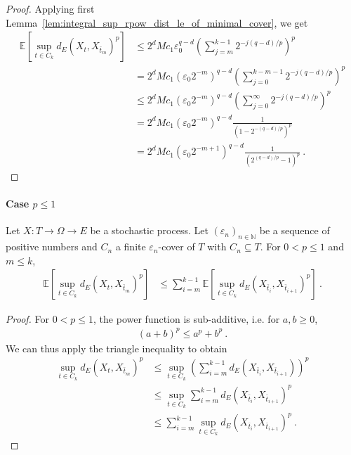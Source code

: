 \begin{proof}
Applying first Lemma~\ref{lem:integral_sup_rpow_dist_le_of_minimal_cover}, we get
\begin{align*}
  \mathbb{E} \left[\sup_{t \in C_k} d_E(X_t, X_{\bar{t}_m})^p \right]
  &\le 2^d M c_1 \varepsilon_0^{q - d} \left( \sum_{j=m}^{k-1} 2^{- j(q - d)/p} \right)^p
  \\
  &= 2^d M c_1 (\varepsilon_0 2^{-m})^{q - d} \left( \sum_{j=0}^{k-m-1} 2^{- j(q - d)/p} \right)^p
  \\
  &\le 2^d M c_1 (\varepsilon_0 2^{-m})^{q - d} \left( \sum_{j=0}^{\infty} 2^{- j(q - d)/p} \right)^p
  \\
  &= 2^d M c_1 (\varepsilon_0 2^{-m})^{q - d} \frac{1}{(1 - 2^{-(q-d)/p})^p}
  \\
  &= 2^d M c_1 (\varepsilon_0 2^{-m+1})^{q - d} \frac{1}{(2^{(q-d)/p} - 1)^p}
  \: .
\end{align*}
\end{proof}



\paragraph{Case $p \le 1$}


\begin{lemma}\label{lem:integral_sup_dist_le_sum_rpow_of_le_one}
  \leanok
Let $X : T \to \Omega \to E$ be a stochastic process.
Let $(\varepsilon_n)_{n \in \mathbb{N}}$ be a sequence of positive numbers and $C_n$ a finite $\varepsilon_n$-cover of $T$ with $C_n \subseteq T$.
For $0 < p \le 1$ and $m \le k$,
\begin{align*}
  \mathbb{E}\left[\sup_{t \in C_k} d_E(X_t, X_{\bar{t}_m})^p \right]
  &\le \sum_{i=m}^{k-1} \mathbb{E}\left[\sup_{t \in C_k} d_E(X_{\bar{t}_i}, X_{\bar{t}_{i+1}})^p\right]
  \: .
\end{align*}
\end{lemma}

\begin{proof}\leanok
For $0 < p \le 1$, the power function is sub-additive, i.e. for $a, b \ge 0$,
\begin{align*}
  (a + b)^p \le a^p + b^p
  \: .
\end{align*}
We can thus apply the triangle inequality to obtain
\begin{align*}
  \sup_{t \in C_k} d_E(X_t, X_{\bar{t}_m})^p
  &\le \sup_{t \in C_k} \left(\sum_{i=m}^{k-1} d_E(X_{\bar{t}_i}, X_{\bar{t}_{i+1}})\right)^p
  \\
  &\le \sup_{t \in C_k} \sum_{i=m}^{k-1} d_E(X_{\bar{t}_i}, X_{\bar{t}_{i+1}})^p
  \\
  &\le \sum_{i=m}^{k-1} \sup_{t \in C_k} d_E(X_{\bar{t}_i}, X_{\bar{t}_{i+1}})^p
  \: .
\end{align*}
\end{proof}


